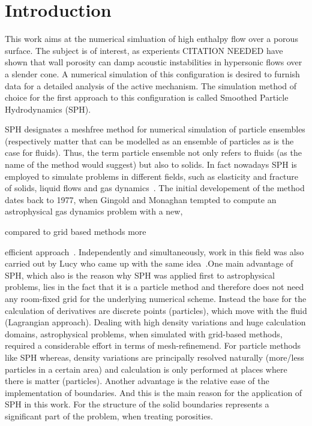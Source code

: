 \documentclass{report}
\begin{document}


\tableofcontents
\chapter{Introduction}
\label{sec:intro}


This work aims at the numerical simluation of high enthalpy flow over a porous
surface. The subject is of interest, as experients CITATION
NEEDED have shown that wall porosity can damp
acoustic instabilities in hypersonic flows over a slender cone. A numerical
simulation of this configuration is desired to furnish data for a detailed
analysis of the active mechanism. The simulation method of choice for the first approach
to this configuration is called Smoothed Particle Hydrodynamics (SPH). 

SPH designates a meshfree method for numerical simulation of particle
ensembles (respectively matter that can be modelled as an ensemble of
particles as is the case for fluids).
Thus, the term particle ensemble not only refers
to fluids (as the name of the method would suggest) but also to solids. In
fact nowadays SPH is employed to simulate problems in different fields,
such as elasticity and fracture of solids, liquid flows and gas
dynamics~\cite{Monaghan2005}.
The initial developement of the method dates back to 1977, when Gingold and
Monaghan tempted to compute an astrophysical gas dynamics problem with a new,

 compared to grid based methods more

efficient approach~\cite{Gingold1977}. Independently and simultaneously, work in
this field was also carried out by Lucy who came up with the same
idea~\cite{Lucy1977}.One main advantage of SPH, which also is the reason why SPH was applied first to astrophysical problems, lies in the fact that it is a particle method and therefore does not need any room-fixed grid for the underlying numerical scheme. Instead
the base for the calculation of derivatives are discrete points (particles), which move with the fluid (Lagrangian approach). Dealing with high density variations and huge calculation domains, astrophysical problems, when simulated with grid-based methods, 
required a considerable effort in terms of mesh-refinemend. For particle methods like SPH whereas, density variations are principally resolved naturally (more/less particles in a certain area) and calculation is only performed at places where there is matter (particles).
Another advantage is the relative ease of the
implementation of boundaries. And this is the main reason for the application of SPH in this work. For the structure of the solid boundaries represents a significant part of the problem, when treating porosities. 
 
\end{document}
